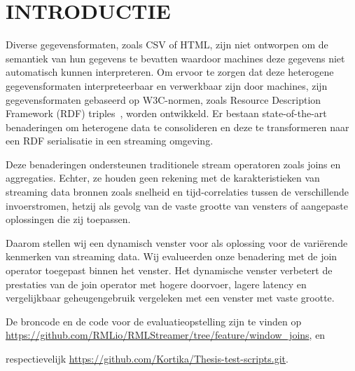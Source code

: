 \section{INTRODUCTIE}
\label{chap:intro}

Diverse gegevensformaten, zoals CSV of HTML, zijn niet ontworpen om de semantiek van hun gegevens te bevatten
waardoor machines deze gegevens niet automatisch kunnen interpreteren. 
Om ervoor te zorgen dat deze heterogene gegevensformaten interpreteerbaar en 
verwerkbaar zijn door machines, zijn gegevensformaten gebaseerd op W3C-normen, zoals Resource Description 
Framework (RDF) triples~\cite{intro_rdf}, worden ontwikkeld. 
Er bestaan state-of-the-art benaderingen om heterogene data te consolideren
en deze te transformeren naar een RDF serialisatie in een streaming omgeving. 

Deze benaderingen ondersteunen traditionele stream operatoren zoals joins en aggregaties. 
Echter, ze houden geen rekening met
de karakteristieken van streaming data bronnen zoals snelheid en 
tijd-correlaties tussen de verschillende
invoerstromen, hetzij als gevolg van de 
vaste grootte van vensters of aangepaste oplossingen die zij toepassen. 

Daarom stellen wij een dynamisch venster voor als oplossing voor de variërende kenmerken van streaming data. Wij evalueerden onze 
benadering met de join operator toegepast binnen het venster. 
Het dynamische venster verbetert de prestaties van de 
join operator met hogere doorvoer, lagere latency en 
vergelijkbaar geheugengebruik vergeleken met een venster met vaste grootte.

De broncode en de code voor de evaluatieopstelling zijn te vinden op
\url{https://github.com/RMLio/RMLStreamer/tree/feature/window_joins}, en 

respectievelijk \href{https://github.com/Kortika/Thesis-test-scripts.git}{https://github.com/Kortika/Thesis-test-scripts.git}.
